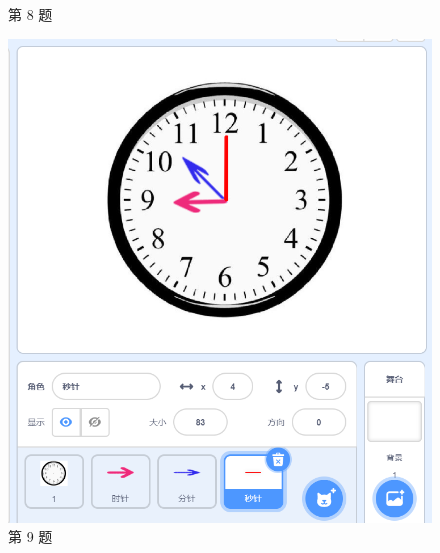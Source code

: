 \documentclass[10pt, a4paper]{article}
\begin{document}
\begin{enumerate}
\begin{figure}[htbp]
\begin{minipage}[t]{.18\textwidth}
                \caption*{第 8 题}
            \end{minipage}
            \begin{minipage}[t]{.195\textwidth}
                \centering
                \includegraphics[width=\textwidth]{9.png}
                \caption*{第 9 题}
            \end{minipage}
        \end{figure}


\end{enumerate}
\end{document}
